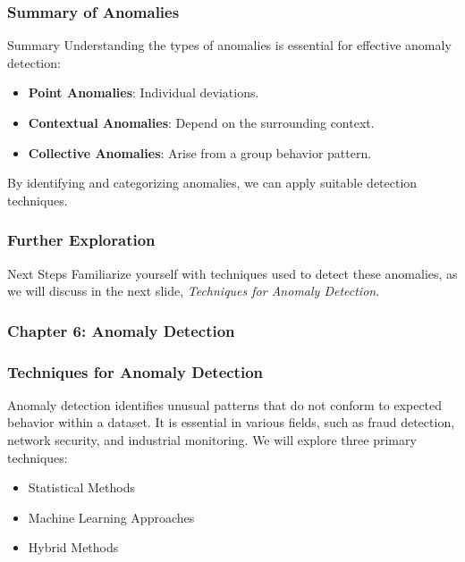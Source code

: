 \documentclass{beamer}
\begin{document}
\begin{frame}[fragile]
    \frametitle{Summary of Anomalies}
    \begin{block}{Summary}
        Understanding the types of anomalies is essential for effective anomaly detection:
        \begin{itemize}
            \item \textbf{Point Anomalies}: Individual deviations.
            \item \textbf{Contextual Anomalies}: Depend on the surrounding context.
            \item \textbf{Collective Anomalies}: Arise from a group behavior pattern.
        \end{itemize}
        By identifying and categorizing anomalies, we can apply suitable detection techniques.
    \end{block}
\end{frame}

\begin{frame}[fragile]
    \frametitle{Further Exploration}
    \begin{block}{Next Steps}
        Familiarize yourself with techniques used to detect these anomalies, as we will discuss in the next slide, \textit{Techniques for Anomaly Detection}.
    \end{block}
\end{frame}

\begin{frame}[fragile]
    \frametitle{Chapter 6: Anomaly Detection}
    \frametitle{Techniques for Anomaly Detection}
    Anomaly detection identifies unusual patterns that do not conform to expected behavior within a dataset. 
    It is essential in various fields, such as fraud detection, network security, and industrial monitoring. 
    We will explore three primary techniques:
    \begin{itemize}
        \item Statistical Methods
        \item Machine Learning Approaches
        \item Hybrid Methods
    \end{itemize}
\end{frame}
\end{document}
